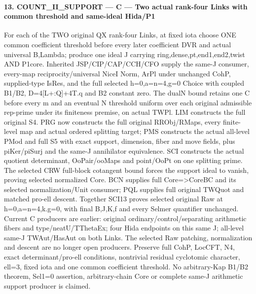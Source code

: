 \paragraph{13. COUNT\_\allowbreak{}II\_\allowbreak{}SUPPORT — C — Two actual rank-four Links with common threshold and same-ideal Hida/\allowbreak{}P1}

For each of the TWO original QX rank-four Links, at fixed iota choose ONE common coefficient threshold before every later coefficient DVR and actual universal B,Lambda; produce one ideal J carrying ring,dense,pt,end1,end2,twist AND P1core. Inherited JSP/\allowbreak{}CIP/\allowbreak{}CAP/\allowbreak{}CCH/\allowbreak{}CFO supply the same-J consumer, every-map reciprocity/\allowbreak{}universal NiceI Norm, ArPl under unchanged CohP, supplied-type IsRes, and the full selected h=0,a=n=4,g=0 Choice with coupled B1/\allowbreak{}B2, D=4[L+:Q]+4T.q and B2 constant zero. The dualN bound retains one C before every m and an eventual N threshold uniform over each original admissible rep-prime under its finiteness premise, on actual TWPl. LIM constructs the full original S4. PRG now constructs the full original RRObj/\allowbreak{}RMaps, every finite-level map and actual ordered splitting target; PMS constructs the actual all-level PMod and full S5 with exact support, dimension, fiber and move fields, plus piKer/\allowbreak{}piSurj and the same-J annihilator equivalence. SCI constructs the actual quotient determinant, OoPair/\allowbreak{}ooMaps and point/\allowbreak{}OoPt on one splitting prime. The selected CRW full-block cotangent bound forces the support ideal to vanish, proving selected normalized Core. BCN supplies full Core=>CoreBC and its selected normalization/\allowbreak{}Unit consumer; PQL supplies full original TWQuot and matched pro-ell descent. Together SCI13 proves selected original Raw at h=0,a=n=4,k.g=0, with final B,J,K,f and every Selmer quantifier unchanged. Current C producers are earlier: original ordinary/\allowbreak{}control/\allowbreak{}separating arithmetic fibers and type/\allowbreak{}neatU/\allowbreak{}TThetaEx; four Hida endpoints on this same J; all-level same-J TWAut/\allowbreak{}HasAut on both Links. The selected Raw patching, normalization and descent are no longer open producers. Preserve full CohP, LocCFT, N4, exact determinant/\allowbreak{}pro-ell conditions, nontrivial residual cyclotomic character, ell=3, fixed iota and one common coefficient threshold. No arbitrary-Kap B1/\allowbreak{}B2 theorem, Sel1=0 assertion, arbitrary-chain Core or complete same-J arithmetic support producer is claimed.

